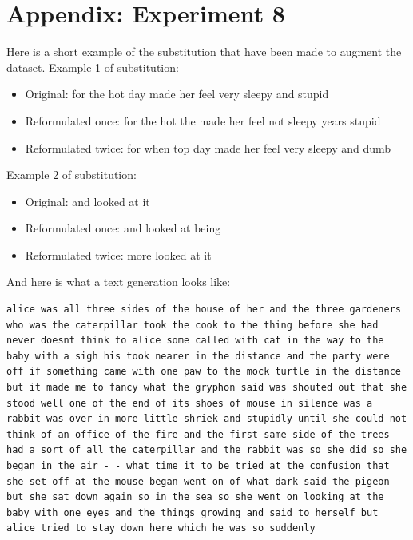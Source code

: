\documentclass{article}
\begin{document}
\section*{Appendix: Experiment 8}

Here is a short example of the substitution that have been made to augment the dataset.
Example 1 of substitution:
\begin{itemize}
    \item Original: for the hot day made her feel very sleepy and stupid
    \item Reformulated once: for the hot the made her feel not sleepy years stupid
    \item Reformulated twice: for when top day made her feel very sleepy and dumb
\end{itemize}
Example 2 of substitution:
\begin{itemize}
    \item Original: and looked at it 
    \item Reformulated once: and looked at being 
    \item Reformulated twice: more looked at it 
\end{itemize}

And here is what a text generation looks like:
\begin{lstlisting}[breaklines]
    alice was all three sides of the house of her and the three gardeners who was the caterpillar took the cook to the thing before she had never doesnt think to alice some called with cat in the way to the baby with a sigh his took nearer in the distance and the party were off if something came with one paw to the mock turtle in the distance but it made me to fancy what the gryphon said was shouted out that she stood well one of the end of its shoes of mouse in silence was a rabbit was over in more little shriek and stupidly until she could not think of an office of the fire and the first same side of the trees had a sort of all the caterpillar and the rabbit was so she did so she began in the air - - what time it to be tried at the confusion that she set off at the mouse began went on of what dark said the pigeon but she sat down again so in the sea so she went on looking at the baby with one eyes and the things growing and said to herself but alice tried to stay down here which he was so suddenly 

\end{lstlisting}
\end{document}
